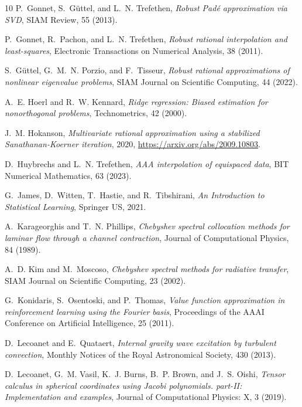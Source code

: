 \documentclass{article}
\begin{document}
\begin{thebibliography}{10}
{\sc P.~Gonnet, S.~G\"{u}ttel, and L.~N. Trefethen}, {\em Robust {P}ad{\'{e}} approximation via {SVD}}, {SIAM} Review, 55 (2013).

{\sc P.~Gonnet, R.~Pachon, and L.~N. Trefethen}, {\em Robust rational interpolation and least-squares}, Electronic Transactions on Numerical Analysis, 38 (2011).

{\sc S.~G\"{u}ttel, G.~M.~N. Porzio, and F.~Tisseur}, {\em Robust rational approximations of nonlinear eigenvalue problems}, SIAM Journal on Scientific Computing, 44 (2022).

{\sc A.~E. Hoerl and R.~W. Kennard}, {\em Ridge regression: Biased estimation for nonorthogonal problems}, Technometrics, 42 (2000).

{\sc J.~M. Hokanson}, {\em Multivariate rational approximation using a stabilized {S}anathanan-{K}oerner iteration}, 2020, \url{https://arxiv.org/abs/2009.10803}.

{\sc D.~Huybrechs and L.~N. Trefethen}, {\em {AAA} interpolation of equispaced data}, {BIT} Numerical Mathematics, 63 (2023).

{\sc G.~James, D.~Witten, T.~Hastie, and R.~Tibshirani}, {\em An Introduction to Statistical Learning}, Springer {US}, 2021.

{\sc A.~Karageorghis and T.~N. Phillips}, {\em Chebyshev spectral collocation methods for laminar flow through a channel contraction}, Journal of Computational Physics, 84 (1989).

{\sc A.~D. Kim and M.~Moscoso}, {\em Chebyshev spectral methods for radiative transfer}, SIAM Journal on Scientific Computing, 23 (2002).

{\sc G.~Konidaris, S.~Osentoski, and P.~Thomas}, {\em Value function approximation in reinforcement learning using the {F}ourier basis}, Proceedings of the {AAAI} Conference on Artificial Intelligence, 25 (2011).

{\sc D.~Lecoanet and E.~Quataert}, {\em Internal gravity wave excitation by turbulent convection}, Monthly Notices of the Royal Astronomical Society, 430 (2013).

{\sc D.~Lecoanet, G.~M. Vasil, K.~J. Burns, B.~P. Brown, and J.~S. Oishi}, {\em Tensor calculus in spherical coordinates using {J}acobi polynomials. part-{II}: Implementation and examples}, Journal of Computational Physics: X, 3 (2019).


\end{thebibliography}
\end{document}
